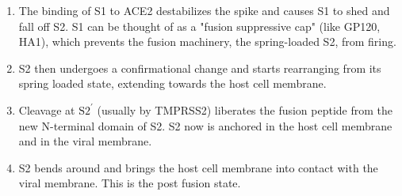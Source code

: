 \documentclass[11pt, oneside]{article}   	%
\begin{document}
\begin{enumerate}
\item The binding of S1 to ACE2 destabilizes the spike and causes S1 to shed and fall off S2. S1 can be thought of as a "fusion suppressive cap" (like GP120, HA1), which prevents 
the fusion machinery, the spring-loaded S2, from firing.

\item S2 then undergoes a confirmational change and starts rearranging from its spring loaded state, extending
towards the host cell membrane.

\item Cleavage at $\text{S2}^\prime$ (usually by TMPRSS2)  liberates the fusion peptide from the new N-terminal
domain of S2. S2 now is anchored in the host cell membrane and in the
viral membrane.
	
\item S2 bends around and brings the host cell membrane into contact
with the viral membrane. This is the post fusion state.

\end{enumerate}





\end{document}
